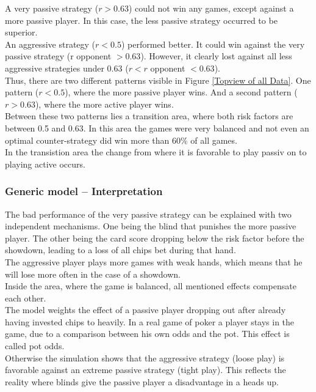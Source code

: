 \documentclass[11pt]{article}
\begin{document}
%
A very passive strategy ($r > 0.63$) could not win any games, except against a more passive player. In this case, the less passive strategy occurred to be superior.\\
%

An aggressive strategy ($r < 0.5$) performed better. It could win against the very passive strategy (r opponent $> 0.63$). However, it clearly lost against all less aggressive strategies under 0.63 ($r < r$ opponent $< 0.63$).\\

Thus, there are two different patterns visible in Figure \ref{Topview of all Data}. One pattern ($r <0.5$), where the more passive player wins. And a second pattern ($r>0.63$), where the more active player wins.\\

Between these two patterns lies a transition area, where both risk factors are between 0.5 and 0.63. In this area the games were very balanced and not even an optimal counter-strategy did win more than 60\% of all games.\\

In the transistion area the change from where it is favorable to play passiv on to playing active occurs.

 \subsubsection{Generic model -- Interpretation}

The bad performance of the very passive strategy can be explained with two independent mechanisms. One being the blind that punishes the more passive player. The other being the card score dropping below the risk factor before the showdown, leading to a loss of all chips bet during that hand.\\
The aggressive player plays more games with weak hands, which means that he will lose more often in the case of a showdown.\\
Inside the area, where the game is balanced, all mentioned effects compensate each other.\\

The model weights the effect of a passive player dropping out after already having invested chips to heavily. In a real game of poker a player stays in the game, due to a comparison between his own odds and the pot. This effect is called pot odds.\\
Otherwise the simulation shows that the aggressive strategy (loose play) is favorable against an extreme passive strategy (tight play). This reflects the reality where blinds give the passive player a disadvantage in a heads up.\\
\end{document}
